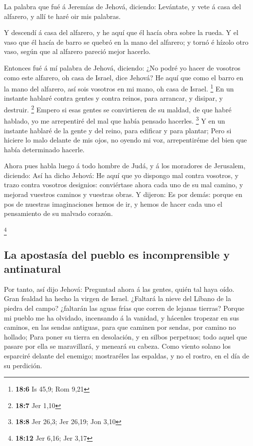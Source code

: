  La palabra que fué á Jeremías de Jehová, diciendo:
 Levántate, y vete á casa del alfarero, y allí te haré oir
mis palabras.

 Y descendí á casa del alfarero, y he aquí que él hacía
obra sobre la rueda.  Y el vaso que él hacía de barro se
quebró en la mano del alfarero; y tornó é hízolo otro vaso, según que al
alfarero pareció mejor hacerlo.

 Entonces fué á mí palabra de Jehová, diciendo:
 ¿No podré yo hacer de vosotros como este alfarero, oh
casa de Israel, dice Jehová? He aquí que como el barro en la mano del
alfarero, así sois vosotros en mi mano, oh casa de Israel. \footnote{\textbf{18:6}
  Is 45,9; Rom 9,21}  En un instante hablaré contra gentes
y contra reinos, para arrancar, y disipar, y destruir. \footnote{\textbf{18:7}
  Jer 1,10}  Empero si esas gentes se convirtieren de su
maldad, de que habré hablado, yo me arrepentiré del mal que había
pensado hacerles. \footnote{\textbf{18:8} Jer 26,3; Jer 26,19; Jon 3,10}
 Y en un instante hablaré de la gente y del reino, para
edificar y para plantar;  Pero si hiciere lo malo delante
de mis ojos, no oyendo mi voz, arrepentiréme del bien que había
determinado hacerle.

 Ahora pues habla luego á todo hombre de Judá, y á los
moradores de Jerusalem, diciendo: Así ha dicho Jehová: He aquí que yo
dispongo mal contra vosotros, y trazo contra vosotros designios:
conviértase ahora cada uno de su mal camino, y mejorad vuestros caminos
y vuestras obras.  Y dijeron: Es por demás: porque en pos
de nuestras imaginaciones hemos de ir, y hemos de hacer cada uno el
pensamiento de su malvado corazón.

\footnote{\textbf{18:12} Jer 6,16; Jer 3,17}

\hypertarget{la-apostasuxeda-del-pueblo-es-incomprensible-y-antinatural}{%
\subsection{La apostasía del pueblo es incomprensible y
antinatural}\label{la-apostasuxeda-del-pueblo-es-incomprensible-y-antinatural}}

 Por tanto, así dijo Jehová: Preguntad ahora á las
gentes, quién tal haya oído. Gran fealdad ha hecho la virgen de Israel.
 ¿Faltará la nieve del Líbano de la piedra del campo?
¿faltarán las aguas frías que corren de lejanas tierras? 
Porque mi pueblo me ha olvidado, incensando á la vanidad, y hácenles
tropezar en sus caminos, en las sendas antiguas, para que caminen por
sendas, por camino no hollado;  Para poner su tierra en
desolación, y en silbos perpetuos; todo aquel que pasare por ella se
maravillará, y meneará su cabeza.  Como viento solano los
esparciré delante del enemigo; mostraréles las espaldas, y no el rostro,
en el día de su perdición.

